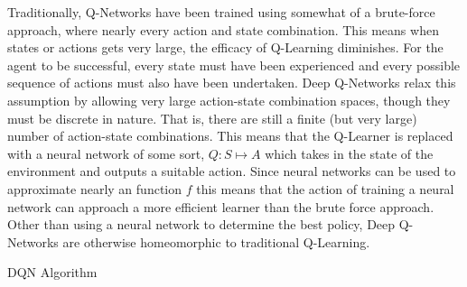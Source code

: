 \documentclass[doc, onecolumn, 12pt]{apa6}
\begin{document}
Traditionally, Q-Networks have been trained using somewhat of a brute-force approach, where nearly every action and state combination. This means when states or actions gets very large, the efficacy of Q-Learning diminishes.  For the agent to be successful, every state must have been experienced and every possible sequence of actions must also have been undertaken. Deep Q-Networks relax this assumption by allowing very large action-state combination spaces, though they must be discrete in nature. That is, there are still a finite (but very large) number of action-state combinations. This means that the Q-Learner is replaced with a neural network of some sort, $Q: S \mapsto A$ which takes in the state of the environment and outputs a suitable action. Since neural networks can be used to approximate nearly an function $f$ this means that the action of training a neural network can approach a more efficient learner than the brute force approach. Other than using a neural network to determine the best policy, Deep Q-Networks are otherwise homeomorphic to traditional Q-Learning. 

\begin{algorithm}[H]
\caption{ DQN Algorithm \citep{DBLP:journals/corr/MnihKSGAWR13}}
\end{algorithm}
\FloatBarrier
\end{document}
